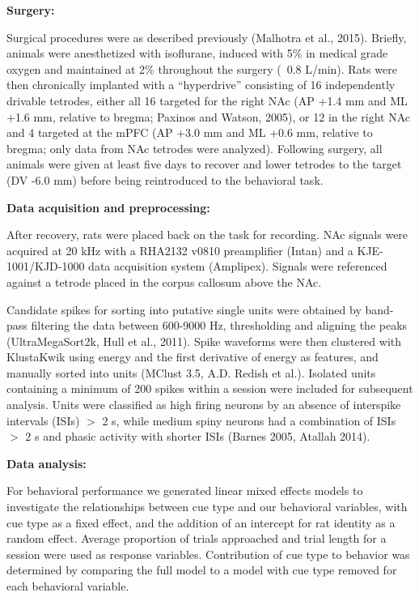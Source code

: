 \documentclass[11pt]{article}
\begin{document}
{\bf Surgery:}

Surgical procedures were as described previously (Malhotra et al., 2015). Briefly, animals were anesthetized with isoflurane, induced with 5\% in medical grade oxygen and maintained at 2\% throughout the surgery (~0.8 L/min). Rats were then chronically implanted with a “hyperdrive” consisting of 16 independently drivable tetrodes, either all 16 targeted for the right NAc (AP +1.4 mm and ML +1.6 mm, relative to bregma; Paxinos and Watson, 2005), or 12 in the right NAc and 4 targeted at the mPFC (AP +3.0 mm and ML +0.6 mm, relative to bregma; only data from NAc tetrodes were analyzed). Following surgery, all animals were given at least five days to recover and lower tetrodes to the target (DV -6.0 mm) before being reintroduced to the behavioral task.

{\bf Data acquisition and preprocessing:}

After recovery, rats were placed back on the task for recording. NAc signals were acquired at 20 kHz with a RHA2132 v0810 preamplifier (Intan) and a KJE-1001/KJD-1000 data acquisition system (Amplipex). Signals were referenced against a tetrode placed in the corpus callosum above the NAc.

Candidate spikes for sorting into putative single units were obtained by band-pass filtering the data between 600-9000 Hz, thresholding and aligning the peaks (UltraMegaSort2k, Hull et al., 2011). Spike waveforms were then clustered with KlustaKwik using energy and the first derivative of energy as features, and manually sorted into units (MClust 3.5, A.D. Redish et al.). Isolated units containing a minimum of 200 spikes within a session were included for subsequent analysis. Units were classified as high firing neurons by an absence of interspike intervals (ISIs) $>$ 2 s, while medium spiny neurons had a combination of ISIs $>$ 2 s and phasic activity with shorter ISIs (Barnes 2005, Atallah 2014).

{\bf Data analysis:}

For behavioral performance we generated linear mixed effects models to investigate the relationships between cue type and our behavioral variables, with cue type as a fixed effect, and the addition of an intercept for rat identity as a random effect. Average proportion of trials approached and trial length for a session were used as response variables. Contribution of cue type to behavior was determined by comparing the full model to a model with cue type removed for each behavioral variable.
\end{document}

